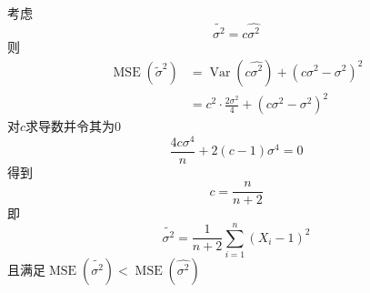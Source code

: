 \documentclass[UTF8,openany]{book}
\begin{document}
	考虑
	\[
	\tilde{\sigma^2}=c\hat{\sigma^2}
	\]
	则
	\[
	\begin{aligned}
		\operatorname{MSE}\left(\widetilde{\sigma}^2\right) & =\operatorname{Var}\left(c \hat{\sigma^2}
		\right)+\left(c \sigma^2-\sigma^2\right)^2 \\
		& =c^2 \cdot \frac{2 \sigma^2}{4}+\left(c \sigma^2-\sigma^2\right)^2
	\end{aligned}
	\]
	对$c$求导数并令其为0
	\[
	\frac{4 c \sigma^4}{n}+2(c-1) \sigma^4=0
	\]
	得到
	\[
	c=\frac{n}{n+2}
	\]
	即
	\[
	\tilde{\sigma^2}=\frac{1}{n+2} \sum_{i=1}^n\left(X_i-1\right)^2 
	\]
	且满足$\operatorname{MSE}\left(\tilde{\sigma^2}\right)<\operatorname{MSE}\left(\hat{\sigma^2}\right)$\\
	
	
	
	
	
	
	
\end{document}
